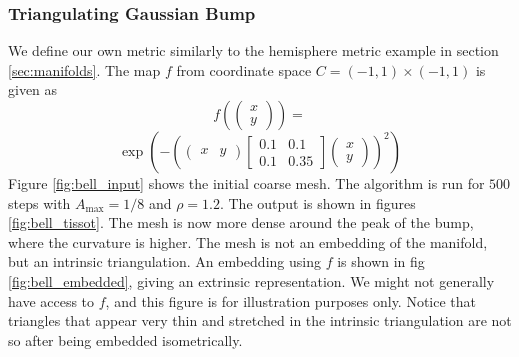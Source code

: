 \subsubsection*{Triangulating Gaussian Bump}
We define our own metric similarly to the hemisphere metric example in section \ref{sec:manifolds}.
The map $f$ from coordinate space $C = (-1, 1) \times (-1, 1)$ is given as 
$$f(\begin{pmatrix}
    x \\ y
\end{pmatrix}) = $$
$$\exp\left(-\left(\begin{pmatrix}
    x & y
\end{pmatrix} \begin{bmatrix} 0.1 & 0.1 \\ 0.1 & 0.35 \end{bmatrix} \begin{pmatrix}
    x \\ y
\end{pmatrix}\right)^2\right)$$
Figure \ref{fig:bell_input} shows the initial coarse mesh. The algorithm is run for $500$ steps with $A_{\text{max}} = 1/8$ and $\rho = 1.2$. The output is shown in figures \ref{fig:bell_tissot}. The mesh is now more dense around the peak of the bump, where the curvature is higher. The mesh is not an embedding of the manifold, but an intrinsic triangulation. An embedding using $f$ is shown in fig \ref{fig:bell_embedded}, giving an extrinsic representation. We might not generally have access to $f$, and this figure is for illustration purposes only. Notice that triangles that appear very thin and stretched in the intrinsic triangulation are not so after being embedded isometrically.
